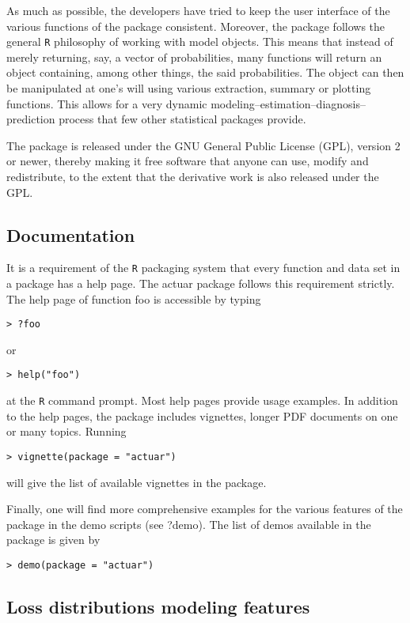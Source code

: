 \documentclass[12pt]{article}
\begin{document}
As much as possible, the developers have tried to keep the user interface of the various functions of the package consistent. Moreover, the package follows the general \texttt{R} philosophy of working with model objects. This means that instead of merely returning, say, a vector of probabilities, many functions will return an object containing, among other things, the said probabilities. The object can then be manipulated at one's will using various extraction, summary or plotting functions. This allows for a very dynamic modeling–estimation–diagnosis–prediction process that few other statistical packages provide.

The package is released under the GNU General Public License (GPL), version 2 or newer, thereby making it free software that anyone can use, modify and redistribute, to the extent that the derivative work is also released under the GPL.

\subsection{Documentation}

It is a requirement of the \texttt{R} packaging system that every function and data set in a package has a help page. The actuar package follows this requirement strictly. The help page of function foo is accessible by typing


\begin{verbatim}
> ?foo
\end{verbatim}
or
\begin{verbatim}
> help("foo")
\end{verbatim}


at the \texttt{R} command prompt. Most help pages provide usage examples. In addition to the help pages, the package includes vignettes, longer PDF documents on one or many topics. Running 
\begin{verbatim}
> vignette(package = "actuar")
\end{verbatim}
will give the list of available vignettes in the package.

Finally, one will find more comprehensive examples for the various features of the package in the demo scripts (see ?demo). The list of demos available in the package is given by

\begin{verbatim}
> demo(package = "actuar")
\end{verbatim}


\subsection{Loss distributions modeling features}
\end{document}
